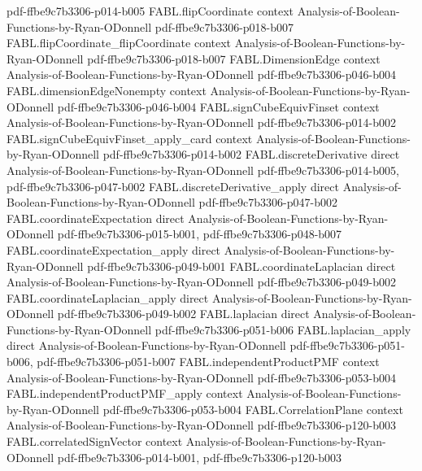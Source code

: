 \begin{theorem}
  {pdf-ffbe9c7b3306-p014-b005}
\proofstep
  {FABL.flipCoordinate}
  {context}
  {Analysis-of-Boolean-Functions-by-Ryan-ODonnell}
  {pdf-ffbe9c7b3306-p018-b007}
\proofstep
  {FABL.flipCoordinate_flipCoordinate}
  {context}
  {Analysis-of-Boolean-Functions-by-Ryan-ODonnell}
  {pdf-ffbe9c7b3306-p018-b007}
\proofstep
  {FABL.DimensionEdge}
  {context}
  {Analysis-of-Boolean-Functions-by-Ryan-ODonnell}
  {pdf-ffbe9c7b3306-p046-b004}
\proofstep
  {FABL.dimensionEdgeNonempty}
  {context}
  {Analysis-of-Boolean-Functions-by-Ryan-ODonnell}
  {pdf-ffbe9c7b3306-p046-b004}
\proofstep
  {FABL.signCubeEquivFinset}
  {context}
  {Analysis-of-Boolean-Functions-by-Ryan-ODonnell}
  {pdf-ffbe9c7b3306-p014-b002}
\proofstep
  {FABL.signCubeEquivFinset_apply_card}
  {context}
  {Analysis-of-Boolean-Functions-by-Ryan-ODonnell}
  {pdf-ffbe9c7b3306-p014-b002}
\proofstep
  {FABL.discreteDerivative}
  {direct}
  {Analysis-of-Boolean-Functions-by-Ryan-ODonnell}
  {pdf-ffbe9c7b3306-p014-b005,
    pdf-ffbe9c7b3306-p047-b002}
\proofstep
  {FABL.discreteDerivative_apply}
  {direct}
  {Analysis-of-Boolean-Functions-by-Ryan-ODonnell}
  {pdf-ffbe9c7b3306-p047-b002}
\proofstep
  {FABL.coordinateExpectation}
  {direct}
  {Analysis-of-Boolean-Functions-by-Ryan-ODonnell}
  {pdf-ffbe9c7b3306-p015-b001,
    pdf-ffbe9c7b3306-p048-b007}
\proofstep
  {FABL.coordinateExpectation_apply}
  {direct}
  {Analysis-of-Boolean-Functions-by-Ryan-ODonnell}
  {pdf-ffbe9c7b3306-p049-b001}
\proofstep
  {FABL.coordinateLaplacian}
  {direct}
  {Analysis-of-Boolean-Functions-by-Ryan-ODonnell}
  {pdf-ffbe9c7b3306-p049-b002}
\proofstep
  {FABL.coordinateLaplacian_apply}
  {direct}
  {Analysis-of-Boolean-Functions-by-Ryan-ODonnell}
  {pdf-ffbe9c7b3306-p049-b002}
\proofstep
  {FABL.laplacian}
  {direct}
  {Analysis-of-Boolean-Functions-by-Ryan-ODonnell}
  {pdf-ffbe9c7b3306-p051-b006}
\proofstep
  {FABL.laplacian_apply}
  {direct}
  {Analysis-of-Boolean-Functions-by-Ryan-ODonnell}
  {pdf-ffbe9c7b3306-p051-b006,
    pdf-ffbe9c7b3306-p051-b007}
\proofstep
  {FABL.independentProductPMF}
  {context}
  {Analysis-of-Boolean-Functions-by-Ryan-ODonnell}
  {pdf-ffbe9c7b3306-p053-b004}
\proofstep
  {FABL.independentProductPMF_apply}
  {context}
  {Analysis-of-Boolean-Functions-by-Ryan-ODonnell}
  {pdf-ffbe9c7b3306-p053-b004}
\proofstep
  {FABL.CorrelationPlane}
  {context}
  {Analysis-of-Boolean-Functions-by-Ryan-ODonnell}
  {pdf-ffbe9c7b3306-p120-b003}
\proofstep
  {FABL.correlatedSignVector}
  {context}
  {Analysis-of-Boolean-Functions-by-Ryan-ODonnell}
  {pdf-ffbe9c7b3306-p014-b001,
    pdf-ffbe9c7b3306-p120-b003}
\proofstep

\end{theorem}
